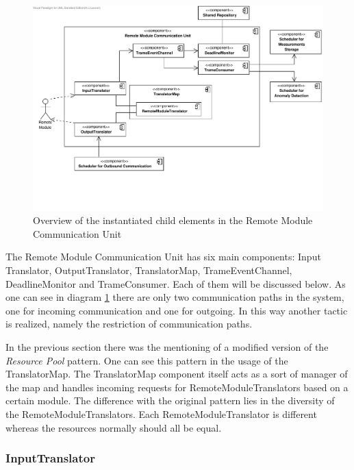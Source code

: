 \begin{figure}[H]
	\begin{centering}
		\includegraphics[width=\textwidth]{figs/add-it2-elements.pdf}
		\caption{Overview of the instantiated child elements in the Remote Module
		Communication Unit}
		\label{fig:it2/elements}
	\end{centering}
\end{figure}

\npar The Remote Module Communication Unit has six main components: Input
Translator, OutputTranslator, TranslatorMap, TrameEventChannel, DeadlineMonitor
and TrameConsumer. Each of them will be discussed below. As one can see in
diagram \ref{fig:it2/elements} there are only two communication paths in the
system, one for incoming communication and one for outgoing. In this way another
tactic is realized, namely the restriction of communication paths.

\npar In the previous section there was the mentioning of a modified version of
the \emph{Resource Pool} pattern. One can see this pattern in the usage of the
TranslatorMap. The TranslatorMap component itself acts as a sort of manager of
the map and handles incoming requests for RemoteModuleTranslators based on a
certain module. The difference with the original pattern lies in the diversity
of the RemoteModuleTranslators. Each RemoteModuleTranslator is different whereas
the resources normally should all be equal.

\subsubsection{InputTranslator}

